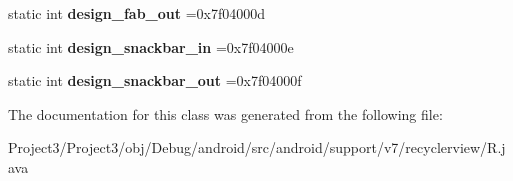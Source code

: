 \begin{DoxyCompactItemize}
static int {\bfseries design\+\_\+fab\+\_\+out} =0x7f04000d
\item 
\mbox{\label{classandroid_1_1support_1_1v7_1_1recyclerview_1_1R_1_1anim_a8b1d2460210d52a8b349ce7b80c67e16}} 
static int {\bfseries design\+\_\+snackbar\+\_\+in} =0x7f04000e
\item 
\mbox{\label{classandroid_1_1support_1_1v7_1_1recyclerview_1_1R_1_1anim_a0e551ec36fc3f14cfb75722b232638dc}} 
static int {\bfseries design\+\_\+snackbar\+\_\+out} =0x7f04000f
\end{DoxyCompactItemize}


The documentation for this class was generated from the following file\+:\begin{DoxyCompactItemize}
\item 
Project3/\+Project3/obj/\+Debug/android/src/android/support/v7/recyclerview/R.\+java\end{DoxyCompactItemize}
